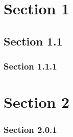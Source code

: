 \documentclass{article}
\begin{document}
\section{Section 1}
\subsection{Section 1.1}
\subsubsection{Section 1.1.1}
\section{Section 2}
\subsubsection{Section 2.0.1}
\end{document}
